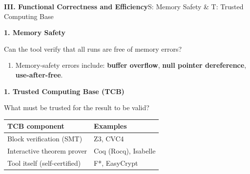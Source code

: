 \documentclass[10pt,aspectratio=1610,compress,dvipsnames]{beamer}
\begin{document}
\begin{frame}[fragile]{\bfseries III. Functional Correctness and Efficiency}{S: Memory Safety \& T: Trusted Computing Base}
\begin{description}[style=nextline]
	\item[\textbf{Scope (S)}] \colorbox{-blue}{\textbf{1. Memory Safety}}
	\item[$\to$] Can the tool verify that all runs are free of memory errors?
\end{description}
\begin{enumerate}[$\bullet$]
	\item Memory-safety errors include: \textbf{buffer overflow}, \textbf{null pointer dereference}, \textbf{use-after-free}.
\end{enumerate}
\medskip
\begin{description}[style=nextline]
	\item[\textbf{Trust (T)}] \colorbox{-blue}{\textbf{1. Trusted Computing Base (TCB)}}
	\item[$\to$] What must be trusted for the result to be valid?
\end{description}
\begin{center}
\renewcommand{\arraystretch}{1.25}
\begin{tabular}{l|l}
\toprule
\textbf{TCB component} & \textbf{Examples} \\
\midrule
Block verification (SMT) & Z3, CVC4 \\
Interactive theorem prover & Coq (Rocq), Isabelle \\
Tool itself (self-certified) & F*, EasyCrypt \\
\bottomrule
\end{tabular}
\end{center}
\end{frame}
\end{document}
